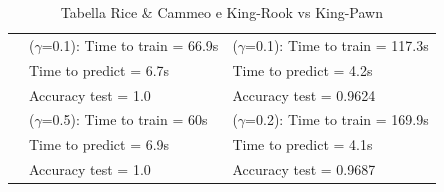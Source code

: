 \documentclass{article}
\begin{document}
\begin{table}[htbp]
\begin{adjustbox}{width=\textwidth}
\begin{tabularx}{\textwidth}{|>{\centering\arraybackslash}X|>{\centering\arraybackslash}X|>{\centering\arraybackslash}X|}
	  & ($\gamma$=0.1): Time to train = 66.9s & ($\gamma$=0.1): Time to train = 117.3s\\
	  & Time to predict = 6.7s & Time to predict = 4.2s\\
	  & Accuracy test = 1.0 & Accuracy test = 0.9624\\
	  & ($\gamma$=0.5): Time to train = 60s & ($\gamma$=0.2): Time to train = 169.9s\\
	  & Time to predict = 6.9s & Time to predict = 4.1s\\
	  & Accuracy test = 1.0 & Accuracy test = 0.9687\\
	  \hline
	  \end{tabularx}
    \end{adjustbox}
	\caption{Tabella Rice \& Cammeo e King-Rook vs King-Pawn}
  \end{table}
\end{document}
